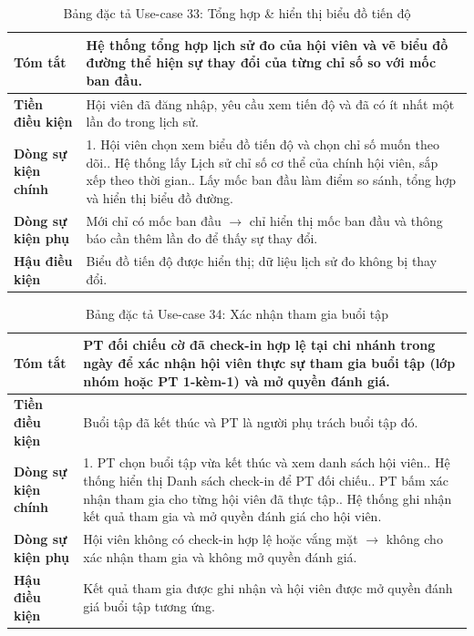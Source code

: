 \documentclass[a4paper,12pt]{article}
\begin{document}
\begin{table}[H]\centering\footnotesize
\begin{tabularx}{\textwidth}{|L{3.2cm}|Y|}
\hline \textbf{Tóm tắt} & Hệ thống tổng hợp lịch sử đo của hội viên và vẽ biểu đồ đường thể hiện sự thay đổi của từng chỉ số so với mốc ban đầu. \\ \hline
\textbf{Tiền điều kiện} & Hội viên đã đăng nhập, yêu cầu xem tiến độ và đã có ít nhất một lần đo trong lịch sử. \\ \hline
\textbf{Dòng sự kiện chính} & 1. Hội viên chọn xem biểu đồ tiến độ và chọn chỉ số muốn theo dõi.. Hệ thống lấy Lịch sử chỉ số cơ thể của chính hội viên, sắp xếp theo thời gian.. Lấy mốc ban đầu làm điểm so sánh, tổng hợp và hiển thị biểu đồ đường. \\ \hline
\textbf{Dòng sự kiện phụ} & Mới chỉ có mốc ban đầu $\rightarrow$ chỉ hiển thị mốc ban đầu và thông báo cần thêm lần đo để thấy sự thay đổi. \\ \hline
\textbf{Hậu điều kiện} & Biểu đồ tiến độ được hiển thị; dữ liệu lịch sử đo không bị thay đổi. \\ \hline
\end{tabularx}
\caption{Bảng đặc tả Use-case 33: Tổng hợp \& hiển thị biểu đồ tiến độ}
\end{table}

\begin{table}[H]\centering\footnotesize
\begin{tabularx}{\textwidth}{|L{3.2cm}|Y|}
\hline \textbf{Tóm tắt} & PT đối chiếu cờ đã check-in hợp lệ tại chi nhánh trong ngày để xác nhận hội viên thực sự tham gia buổi tập (lớp nhóm hoặc PT 1-kèm-1) và mở quyền đánh giá. \\ \hline
\textbf{Tiền điều kiện} & Buổi tập đã kết thúc và PT là người phụ trách buổi tập đó. \\ \hline
\textbf{Dòng sự kiện chính} & 1. PT chọn buổi tập vừa kết thúc và xem danh sách hội viên.. Hệ thống hiển thị Danh sách check-in để PT đối chiếu.. PT bấm xác nhận tham gia cho từng hội viên đã thực tập.. Hệ thống ghi nhận kết quả tham gia và mở quyền đánh giá cho hội viên. \\ \hline
\textbf{Dòng sự kiện phụ} & Hội viên không có check-in hợp lệ hoặc vắng mặt $\rightarrow$ không cho xác nhận tham gia và không mở quyền đánh giá. \\ \hline
\textbf{Hậu điều kiện} & Kết quả tham gia được ghi nhận và hội viên được mở quyền đánh giá buổi tập tương ứng. \\ \hline
\end{tabularx}
\caption{Bảng đặc tả Use-case 34: Xác nhận tham gia buổi tập}
\end{table}
\end{document}
